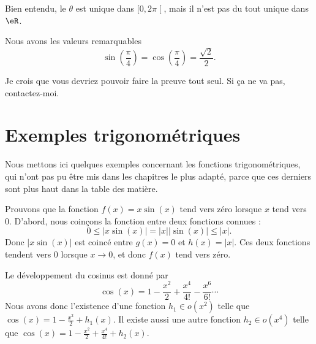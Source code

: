 Bien entendu, le \( \theta\) est unique dans \( \mathopen[ 0 , 2\pi \mathclose[\), mais il n'est pas du tout unique dans \( \eR\).

\begin{lemma}       \label{LEMooIGNPooPEctJy}
    Nous avons les valeurs remarquables
    \begin{equation}
        \sin(\frac{ \pi }{ 4 })=\cos(\frac{ \pi }{ 4 })=\frac{ \sqrt{ 2 } }{2}.
    \end{equation}
\end{lemma}
Je crois que vous devriez pouvoir faire la preuve tout seul. Si ça ne va pas, contactez-moi.

\section{Exemples trigonométriques}

Nous mettons ici quelques exemples concernant les fonctions trigonométriques, qui n'ont pas pu être mis dans les chapitres le plus adapté, parce que ces derniers sont plus haut dans la table des matière.

\begin{example}     \label{EXooSPFDooSluUGV}
	Prouvons que la fonction $f(x)=x\sin(x)$ tend vers zéro lorsque $x$ tend vers $0$. D'abord, nous coinçons la fonction entre deux fonctions connues :
	\begin{equation}
		0\leq| x\sin(x) |=| x | |\sin(x) |\leq | x |.
	\end{equation}
	Donc $| x\sin(x) |$ est coincé entre $g(x)=0$ et $h(x)=| x |$. Ces deux fonctions tendent vers $0$ lorsque $x\to 0$, et donc $f(x)$ tend vers zéro.
\end{example}

\begin{example}[Taylor]     \label{EXooXLYJooKVqhTE}
	Le développement du cosinus est donné par
	\begin{equation}
		\cos(x)=1-\frac{ x^2 }{ 2 }+\frac{ x^4 }{ 4! }-\frac{ x^6 }{ 6! }\cdots
	\end{equation}
	Nous avons donc l'existence d'une fonction $h_1\in o(x^2)$ telle que $\cos(x)=1-\frac{ x^2 }{ 2 }+h_1(x)$. Il existe aussi une autre fonction $h_2\in o(x^4)$ telle que $\cos(x)=1-\frac{ x^2 }{ 2 }+\frac{ x^4 }{ 4! }+h_2(x)$.
\end{example}
